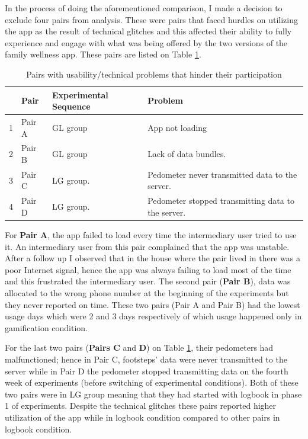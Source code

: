 In the process of doing the aforementioned comparison, I made a decision to exclude four pairs from analysis. These were pairs that faced hurdles on utilizing the app as the result of technical glitches and this affected their ability to fully experience and engage with what was being offered by the two versions of the family wellness app. These pairs are listed on Table \ref{table:usageproblems}.

\begin{table}[h!]
  \begin{center}
    \caption{Pairs with usability/technical problems that hinder their participation}
    \label{table:usageproblems}
	\begin{tabular}{|l|l|l|p{6cm}|}
		\hline
		&Pair&Experimental Sequence&Problem\\
		\hline
		1&Pair A&GL group &App not loading\\
		\hline
		2&Pair B&GL group&Lack of data bundles. \\
		\hline
		3&Pair C & LG group.& Pedometer never transmitted data to the server.\\
		\hline
		4&Pair D & LG group.& Pedometer stopped transmitting data to the server.\\
	\hline
	\end{tabular}
  \end{center}
\end{table}

For \textbf{Pair A}, the app failed to load every time the intermediary user tried to use it. An intermediary user from this pair complained that the app was unstable. After a follow up I observed that in the house where the pair lived in there was a poor Internet signal, hence the app was always failing to load most of the time and this frustrated the intermediary user. The second pair (\textbf{Pair B}), data was allocated to the wrong phone number at the beginning of the experiments but they never reported on time. These two pairs (Pair A and Pair B) had the lowest usage days which were 2 and 3 days respectively of which usage happened only in gamification condition.

For the last two pairs (\textbf{Pairs C} and \textbf{D}) on Table \ref{table:usageproblems}, their pedometers had malfunctioned; hence in Pair C, footsteps' data were never transmitted to the server while in Pair D the pedometer stopped transmitting data on the fourth week of experiments (before switching of experimental conditions). Both of these two pairs were in LG group meaning that they had started with logbook in phase 1 of experiments. Despite the technical glitches these pairs reported higher utilization of the app while in logbook condition compared to other pairs in logbook condition.

